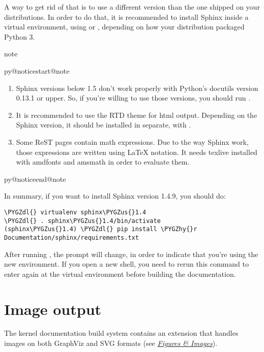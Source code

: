 \documentclass[a4paper,8pt,english]{sphinxmanual}
\makeatletter
\renewenvironment{notice}[2]{%
          \def\py@noticetype{#1}
          \begin{coloredbox}{#1}
          \bf\it
          \par\strong{#2}
          \csname py@noticestart@#1\endcsname
        }
	{
          \csname py@noticeend@\py@noticetype\endcsname
          \end{coloredbox}
        }
\def\PYGZus{\char`\_}
\def\PYGZdl{\char`\$}
\def\PYGZhy{\char`\-}
\makeatother
\begin{document}
A way to get rid of that is to use a different version than the one shipped
on your distributions. In order to do that, it is recommended to install
Sphinx inside a virtual environment, using 
or , depending on how your distribution packaged Python 3.

\begin{notice}{note}{Note:}\begin{enumerate}
\item {} 
Sphinx versions below 1.5 don't work properly with Python's
docutils version 0.13.1 or upper. So, if you're willing to use
those versions, you should run .

\item {} 
It is recommended to use the RTD theme for html output. Depending
on the Sphinx version, it should be installed  in separate,
with .

\item {} 
Some ReST pages contain math expressions. Due to the way Sphinx work,
those expressions are written using LaTeX notation. It needs texlive
installed with amdfonts and amsmath in order to evaluate them.

\end{enumerate}
\end{notice}

In summary, if you want to install Sphinx version 1.4.9, you should do:

\begin{Verbatim}[commandchars=\\\{\}]
\PYGZdl{} virtualenv sphinx\PYGZus{}1.4
\PYGZdl{} . sphinx\PYGZus{}1.4/bin/activate
(sphinx\PYGZus{}1.4) \PYGZdl{} pip install \PYGZhy{}r Documentation/sphinx/requirements.txt
\end{Verbatim}

After running , the prompt will change,
in order to indicate that you're using the new environment. If you
open a new shell, you need to rerun this command to enter again at
the virtual environment before building the documentation.


\section{Image output}
\label{doc-guide/sphinx:image-output}
The kernel documentation build system contains an extension that
handles images on both GraphViz and SVG formats (see
{\hyperref[doc\string-guide/sphinx:sphinx\string-kfigure]{\emph{Figures \& Images}}}).
\end{document}
